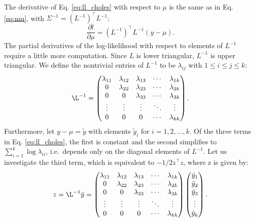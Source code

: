 \documentclass{article}
\begin{document}
The derivative of Eq. \ref{eq:ll_choles} with respect to $\mu$ is the same 
as in Eq. \ref{eq:mu}, with $\Sigma^{-1} =  (L^{-1})^\top L^{-1}$:
%
\begin{equation}
 \frac{\partial l}{\partial \mu} = (L^{-1})^\top L^{-1} (y-\mu).
 \label{eq:mu_chol}
\end{equation}
%
The partial derivatives of the log-likelihood with respect to elements of 
$L^{-1}$ require a little more computation. Since $L$ is lower triangular, 
$L^{-1}$ is upper triangular. We define the nontrivial entries of $L^{-1}$ 
to be $\lambda_{ij}$ with $1 \leq i \leq j \leq k$: 
%
\begin{equation}
  \L^{-1}=
  \begin{pmatrix}
    \lambda_{11} & \lambda_{12} & \lambda_{13} & \cdots & \lambda_{1k} \\
    0 & \lambda_{22} & \lambda_{23} & \cdots & \lambda_{2k} \\
    0 & 0 & \lambda_{33} & \cdots & \lambda_{3k} \\
    \vdots & \vdots & \vdots & \ddots & \vdots \\
    0 & 0 & 0 & \cdots & \lambda_{kk}
  \end{pmatrix}.
\end{equation}
%
Furthermore, let $y-\mu = \tilde{y}$ with elements $\tilde{y}_i$ for 
$i = 1, 2, \dots, k$. 
Of the three terms in Eq. \ref{eq:ll_choles}, the first is constant and the 
second simplifies to $\sum_{i=1}^k \log{\lambda_{ii}}$, i.e.\ depends only 
on the diagonal elements of $L^{-1}$. Let us investigate the third term, which 
is equivalent to $-1/2 z^\top z$, where z is given by:
%
\begin{equation}
	z = \L^{-1} \tilde{y}=
  \begin{pmatrix}
    \lambda_{11} & \lambda_{12} & \lambda_{13} & \cdots & \lambda_{1k} \\
    0 & \lambda_{22} & \lambda_{23} & \cdots & \lambda_{2k} \\
    0 & 0 & \lambda_{33} & \cdots & \lambda_{3k} \\
    \vdots & \vdots & \vdots & \ddots & \vdots \\
    0 & 0 & 0 & \cdots & \lambda_{kk}
  \end{pmatrix}
  \begin{pmatrix}
    \tilde{y}_1 \\
    \tilde{y}_2 \\
    \tilde{y}_3	\\
    \vdots \\
    \tilde{y}_k
  \end{pmatrix}.
\end{equation}
\end{document}
